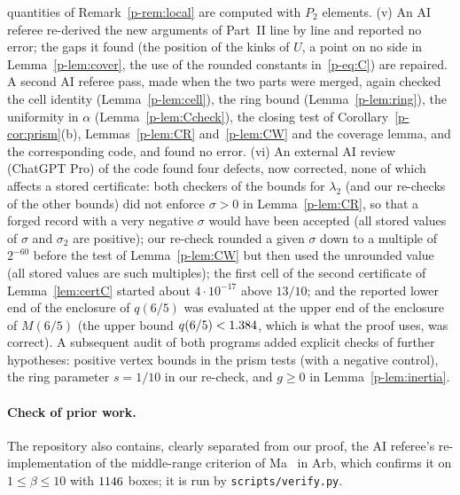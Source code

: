 \documentclass[11pt]{article}
\theoremstyle{remark}
\begin{document}
quantities of Remark~\ref{p-rem:local} are computed with $P_2$ elements. (v) An AI referee re-derived the
new arguments of Part~II line by line and reported no error; the gaps it found (the position of the kinks
of $U$, a point on no side in Lemma~\ref{p-lem:cover}, the use of the rounded constants
in~\eqref{p-eq:C}) are repaired. A second AI referee pass, made when the two parts were merged, again
checked the cell identity (Lemma~\ref{p-lem:cell}), the ring bound (Lemma~\ref{p-lem:ring}), the
uniformity in $\alpha$ (Lemma~\ref{p-lem:Ccheck}), the closing test of Corollary~\ref{p-cor:prism}(b),
Lemmas~\ref{p-lem:CR} and~\ref{p-lem:CW} and the coverage lemma, and the corresponding code, and found no
error. (vi) An external AI review (ChatGPT Pro) of the code found four defects, now corrected, none of
which affects a stored certificate: both checkers of the bounds for $\lambda_2$ (and our re-checks of
the other bounds) did not enforce $\sigma>0$ in Lemma~\ref{p-lem:CR}, so that a forged record with
a very negative $\sigma$ would have been accepted (all stored values of $\sigma$ and $\sigma_2$ are
positive); our re-check rounded a given $\sigma$ down to a multiple of $2^{-60}$ before the test of
Lemma~\ref{p-lem:CW} but then used the unrounded value (all stored values are such multiples); the
first cell of the second certificate of Lemma~\ref{lem:certC} started about $4\cdot10^{-17}$ above
$13/10$; and the reported lower end of the enclosure of $q(6/5)$ was evaluated at the upper end of the
enclosure of $M(6/5)$ (the upper bound $q(6/5)<1.384$, which is what the proof uses, was correct). A
subsequent audit of both programs added explicit checks of further hypotheses: positive vertex bounds
in the prism tests (with a negative control), the ring parameter $s=1/10$ in our re-check, and $g\ge0$
in Lemma~\ref{p-lem:inertia}.

\paragraph{Check of prior work.} The repository also contains, clearly separated from our proof, the
AI referee's re-implementation of the middle-range criterion of Ma~\cite[Proposition~2]{Ma} in Arb, which
confirms it on $1\le\beta\le10$ with $1146$ boxes; it is run by \texttt{scripts/verify.py}.
\end{document}
